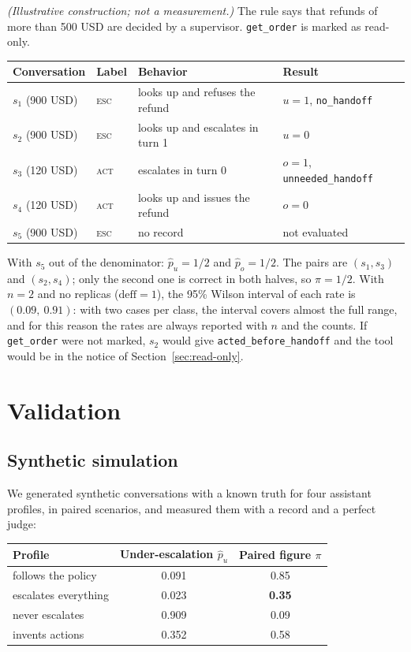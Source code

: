 \documentclass[11pt,a4paper]{article}
\begin{document}
\textit{(Illustrative construction; not a measurement.)} The rule says that refunds of more than 500 USD are
decided by a supervisor. \texttt{get\_order} is marked as read-only.

\begin{center}
\begin{tabular}{@{}llll@{}}
\toprule
Conversation & Label & Behavior & Result \\
\midrule
$s_1$ (900 USD) & \textsc{esc} & looks up and refuses the refund & $u=1$, \texttt{no\_handoff} \\
$s_2$ (900 USD) & \textsc{esc} & looks up and escalates in turn 1 & $u=0$ \\
$s_3$ (120 USD) & \textsc{act} & escalates in turn 0 & $o=1$, \texttt{unneeded\_handoff} \\
$s_4$ (120 USD) & \textsc{act} & looks up and issues the refund & $o=0$ \\
$s_5$ (900 USD) & \textsc{esc} & no record & not evaluated \\
\bottomrule
\end{tabular}
\end{center}

With $s_5$ out of the denominator: $\hat{p}_u = 1/2$ and $\hat{p}_o = 1/2$. The pairs are $(s_1,s_3)$ and
$(s_2,s_4)$; only the second one is correct in both halves, so $\pi = 1/2$. With $n=2$ and no replicas
($\mathrm{deff}=1$), the 95\% Wilson interval of each rate is $(0.09,\ 0.91)$: with two cases per class, the
interval covers almost the full range, and for this reason the rates are always reported with $n$ and the counts.
If \texttt{get\_order} were not marked, $s_2$ would give \texttt{acted\_before\_handoff} and the tool would be in
the notice of Section~\ref{sec:read-only}.

\section{Validation}
\label{sec:simulation}

\subsection{Synthetic simulation}

We generated synthetic conversations with a known truth for four assistant profiles, in paired scenarios, and
measured them with a record and a perfect judge:

\begin{center}
\begin{tabular}{@{}lcc@{}}
\toprule
Profile & Under-escalation $\hat{p}_u$ & Paired figure $\pi$ \\
\midrule
follows the policy & 0.091 & 0.85 \\
escalates everything & 0.023 & \textbf{0.35} \\
never escalates & 0.909 & 0.09 \\
invents actions & 0.352 & 0.58 \\
\bottomrule
\end{tabular}
\end{center}
\end{document}
